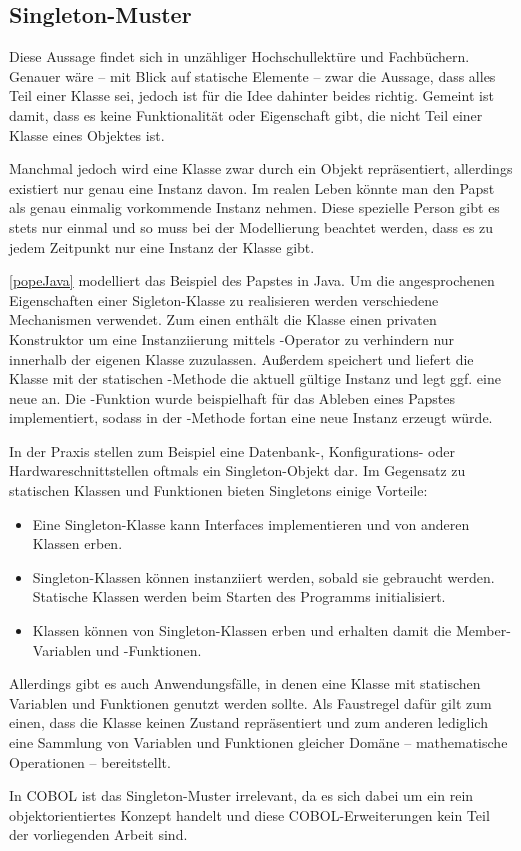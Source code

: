 \subsection{Singleton-Muster}
 \cite{susanne_hackmack_objekte_2018} Diese Aussage findet sich in unzähliger Hochschullektüre und Fachbüchern. Genauer wäre -- mit Blick auf statische Elemente -- zwar die Aussage, dass alles Teil einer Klasse sei, jedoch ist für die Idee dahinter beides richtig. Gemeint ist damit, dass es keine Funktionalität oder Eigenschaft gibt, die nicht Teil einer Klasse \bzw eines Objektes ist.

Manchmal jedoch wird eine Klasse zwar durch ein Objekt repräsentiert, allerdings existiert nur genau eine Instanz davon. Im realen Leben könnte man \zB den Papst als genau einmalig vorkommende Instanz nehmen. Diese spezielle Person gibt es stets nur einmal und so muss bei der Modellierung beachtet werden, dass es zu jedem Zeitpunkt nur eine Instanz der Klasse gibt.


\autoref{popeJava} modelliert das Beispiel des Papstes in Java. Um die angesprochenen Eigenschaften einer Sigleton-Klasse zu realisieren werden verschiedene Mechanismen verwendet. Zum einen enthält die Klasse einen privaten Konstruktor um eine Instanziierung mittels -Operator zu verhindern \bzw nur innerhalb der eigenen Klasse zuzulassen. Außerdem speichert und liefert die Klasse mit der statischen -Methode die aktuell gültige Instanz und legt ggf. eine neue an. Die -Funktion wurde beispielhaft für das Ableben eines Papstes implementiert, sodass in der -Methode fortan eine neue Instanz erzeugt würde.

In der Praxis stellen zum Beispiel eine Datenbank-, Konfigurations- oder Hardwareschnittstellen oftmals ein Singleton-Objekt dar. Im Gegensatz zu statischen Klassen und Funktionen bieten Singletons einige Vorteile:

\begin{itemize}
    \item Eine Singleton-Klasse kann Interfaces implementieren und von anderen Klassen erben.
    \item Singleton-Klassen können instanziiert werden, sobald sie gebraucht werden. Statische Klassen werden beim Starten des Programms initialisiert.
    \item Klassen können von Singleton-Klassen erben und erhalten damit die Member-Variablen und -Funktionen.
\end{itemize}

Allerdings gibt es auch Anwendungsfälle, in denen eine Klasse mit statischen Variablen und Funktionen genutzt werden sollte. Als Faustregel dafür gilt zum einen, dass die Klasse keinen Zustand repräsentiert und zum anderen lediglich eine Sammlung von Variablen und Funktionen gleicher Domäne -- \zB mathematische Operationen -- bereitstellt.

In COBOL ist das Singleton-Muster irrelevant, da es sich dabei um ein rein objektorientiertes Konzept handelt und diese COBOL-Erweiterungen kein Teil der vorliegenden Arbeit sind.